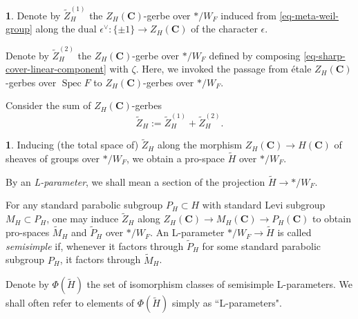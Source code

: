 \documentclass[10pt,english,reqno]{amsart}
\newcommand{\complexes}{\mathbf C}
\newcommand{\Spec}{\operatorname{Spec}}
\theoremstyle{definition}
\numberwithin{equation}{section}
\newtheorem{untitledsubsubsection}[subsubsection]{}
\newenvironment{void}
{\begin{untitledsubsubsection}}
{\end{untitledsubsubsection}}
\begin{document}
\begin{void}
\label{void-metaplectic-dual-etale-gerbes}
Denote by $\widetilde Z_H^{(1)}$ the $Z_H(\complexes)$-gerbe over $*/W_F$ induced from \eqref{eq-meta-weil-group} along the dual $\epsilon^{\vee} : \{\pm 1\} \rightarrow Z_H(\complexes)$ of the character $\epsilon$.

Denote by $\widetilde Z_H^{(2)}$ the $Z_H(\complexes)$-gerbe over $*/W_F$ defined by composing \eqref{eq-sharp-cover-linear-component} with $\zeta$. Here, we invoked the passage from \'etale $Z_H(\complexes)$-gerbes over $\Spec F$ to $Z_H(\complexes)$-gerbes over $*/W_F$.

Consider the sum of $Z_H(\complexes)$-gerbes
\begin{equation}
\label{eq-metaplectic-ell-group-center}
\widetilde Z_H := \widetilde Z_H^{(1)} + \widetilde Z_H^{(2)}.
\end{equation}
\end{void}


\begin{void}
Inducing (the total space of) $\widetilde Z_H$ along the morphism $Z_H(\complexes) \rightarrow H(\complexes)$ of sheaves of groups over $*/W_F$, we obtain a pro-space $\widetilde H$ over $*/W_F$.

By an \emph{L-parameter}, we shall mean a section of the projection $\widetilde H \rightarrow */W_F$.

For any standard parabolic subgroup $P_H \subset H$ with standard Levi subgroup $M_H \subset P_H$, one may induce $\widetilde Z_H$ along $Z_H(\complexes) \rightarrow M_H(\complexes) \rightarrow P_H(\complexes)$ to obtain pro-spaces $\widetilde M_H$ and $\widetilde P_H$ over $*/W_F$. An L-parameter $*/W_F \rightarrow \widetilde H$ is called \emph{semisimple} if, whenever it factors through $\widetilde P_H$ for some standard parabolic subgroup $P_H$, it factors through $\widetilde M_H$.

Denote by $\Phi(\widetilde H)$ the set of isomorphism classes of semisimple L-parameters. We shall often refer to elements of $\Phi(\widetilde H)$ simply as ``L-parameters".
\end{void}

\end{document}

